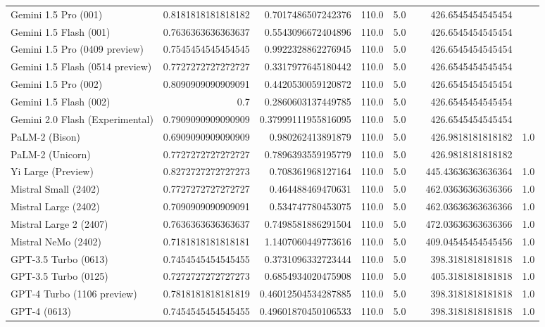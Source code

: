 \begin{table}[htp]
{\begin{tabular}{lrrrrrrr}
Gemini 1.5 Pro (001) & 0.8181818181818182 & 0.7017486507242376 & 110.0 & 5.0 &  & 426.6545454545454 &  \\
Gemini 1.5 Flash (001) & 0.7636363636363637 & 0.5543096672404896 & 110.0 & 5.0 &  & 426.6545454545454 &  \\
Gemini 1.5 Pro (0409 preview) & 0.7545454545454545 & 0.9922328862276945 & 110.0 & 5.0 &  & 426.6545454545454 &  \\
Gemini 1.5 Flash (0514 preview) & 0.7727272727272727 & 0.3317977645180442 & 110.0 & 5.0 &  & 426.6545454545454 &  \\
Gemini 1.5 Pro (002) & 0.8090909090909091 & 0.4420530059120872 & 110.0 & 5.0 &  & 426.6545454545454 &  \\
Gemini 1.5 Flash (002) & 0.7 & 0.2860603137449785 & 110.0 & 5.0 &  & 426.6545454545454 &  \\
Gemini 2.0 Flash (Experimental) & 0.7909090909090909 & 0.37999111955816095 & 110.0 & 5.0 &  & 426.6545454545454 &  \\
PaLM-2 (Bison) & 0.6909090909090909 & 0.980262413891879 & 110.0 & 5.0 &  & 426.9818181818182 & 1.0 \\
PaLM-2 (Unicorn) & 0.7727272727272727 & 0.7896393559195779 & 110.0 & 5.0 &  & 426.9818181818182 &  \\
Yi Large (Preview) & 0.8272727272727273 & 0.708361968127164 & 110.0 & 5.0 &  & 445.43636363636364 & 1.0 \\
Mistral Small (2402) & 0.7727272727272727 & 0.464488469470631 & 110.0 & 5.0 &  & 462.03636363636366 & 1.0 \\
Mistral Large (2402) & 0.7090909090909091 & 0.534747780453075 & 110.0 & 5.0 &  & 462.03636363636366 & 1.0 \\
Mistral Large 2 (2407) & 0.7636363636363637 & 0.7498581886291504 & 110.0 & 5.0 &  & 472.03636363636366 & 1.0 \\
Mistral NeMo (2402) & 0.7181818181818181 & 1.1407060449773616 & 110.0 & 5.0 &  & 409.04545454545456 & 1.0 \\
GPT-3.5 Turbo (0613) & 0.7454545454545455 & 0.3731096332723444 & 110.0 & 5.0 &  & 398.3181818181818 & 1.0 \\
GPT-3.5 Turbo (0125) & 0.7272727272727273 & 0.6854934020475908 & 110.0 & 5.0 &  & 405.3181818181818 & 1.0 \\
GPT-4 Turbo (1106 preview) & 0.7818181818181819 & 0.46012504534287885 & 110.0 & 5.0 &  & 398.3181818181818 & 1.0 \\
GPT-4 (0613) & 0.7454545454545455 & 0.49601870450106533 & 110.0 & 5.0 &  & 398.3181818181818 & 1.0 \\

\end{tabular}}
\end{table}
